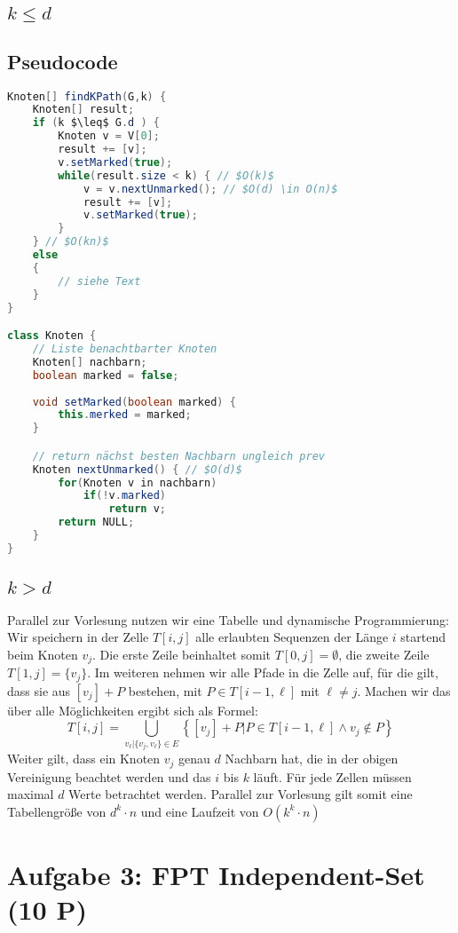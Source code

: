 \documentclass[a4paper,11pt,twoside]{scrartcl}
\begin{document}
\subsection{$k \leq d$ }
\subsection{Pseudocode}
\begin{lstlisting}[language=Java]
Knoten[] findKPath(G,k) {
	Knoten[] result;
	if (k $\leq$ G.d ) {
		Knoten v = V[0];
		result += [v];
		v.setMarked(true);
		while(result.size < k) { // $O(k)$
			v = v.nextUnmarked(); // $O(d) \in O(n)$
			result += [v];
			v.setMarked(true);
		}
	} // $O(kn)$
	else 
	{
		// siehe Text
	}
}

class Knoten {
	// Liste benachtbarter Knoten
	Knoten[] nachbarn;
	boolean marked = false;
	
	void setMarked(boolean marked) {
		this.merked = marked;
	}

	// return nächst besten Nachbarn ungleich prev
	Knoten nextUnmarked() { // $O(d)$
		for(Knoten v in nachbarn)
			if(!v.marked)
				return v;
		return NULL;
	}
}
\end{lstlisting}
\subsection{$k > d$}
Parallel zur Vorlesung nutzen wir eine Tabelle und dynamische Programmierung:\\
Wir speichern in der Zelle $T[i,j]$ alle erlaubten Sequenzen der Länge $i$ startend beim Knoten $v_j$. Die erste Zeile beinhaltet somit $T[0,j] = \emptyset$, die zweite Zeile $T[1,j] = \{ v_j \}$. Im weiteren nehmen wir alle Pfade in die Zelle auf, für die gilt, dass sie aus $[v_j] + P$ bestehen, mit $P \in T[i-1,\ell]$ mit $\ell \neq j$. Machen wir das über alle Möglichkeiten ergibt sich als Formel:
\[ T[i,j] = \bigcup_{v_\ell | \{v_j,v_\ell\} \in E } \left\{ [v_j] + P | P \in T[i-1, \ell] \land v_j \notin P \right\} \]
Weiter gilt, dass ein Knoten $v_j$ genau $d$ Nachbarn hat, die in der obigen Vereinigung beachtet werden und das $i$ bis $k$ läuft. Für jede Zellen müssen maximal $d$ Werte betrachtet werden. Parallel zur Vorlesung gilt somit eine Tabellengröße von $d^k \cdot n$ und eine Laufzeit von $O(k^k \cdot n)$
\section{Aufgabe 3: FPT Independent-Set (10 P)}
\end{document}
